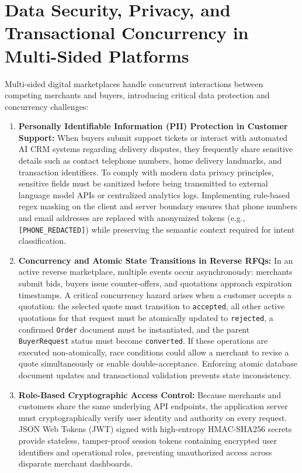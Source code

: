 \section{Data Security, Privacy, and Transactional Concurrency in Multi-Sided Platforms}

Multi-sided digital marketplaces handle concurrent interactions between competing merchants and buyers, introducing critical data protection and concurrency challenges:

\begin{enumerate}
    \item \textbf{Personally Identifiable Information (PII) Protection in Customer Support:} When buyers submit support tickets or interact with automated AI CRM systems regarding delivery disputes, they frequently share sensitive details such as contact telephone numbers, home delivery landmarks, and transaction identifiers. To comply with modern data privacy principles, sensitive fields must be sanitized before being transmitted to external language model APIs or centralized analytics logs. Implementing rule-based regex masking on the client and server boundary ensures that phone numbers and email addresses are replaced with anonymized tokens (e.g., \texttt{[PHONE\_REDACTED]}) while preserving the semantic context required for intent classification.
    \item \textbf{Concurrency and Atomic State Transitions in Reverse RFQs:} In an active reverse marketplace, multiple events occur asynchronously: merchants submit bids, buyers issue counter-offers, and quotations approach expiration timestamps. A critical concurrency hazard arises when a customer accepts a quotation: the selected quote must transition to \texttt{accepted}, all other active quotations for that request must be atomically updated to \texttt{rejected}, a confirmed \texttt{Order} document must be instantiated, and the parent \texttt{BuyerRequest} status must become \texttt{converted}. If these operations are executed non-atomically, race conditions could allow a merchant to revise a quote simultaneously or enable double-acceptance. Enforcing atomic database document updates and transactional validation prevents state inconsistency.
    \item \textbf{Role-Based Cryptographic Access Control:} Because merchants and customers share the same underlying API endpoints, the application server must cryptographically verify user identity and authority on every request. JSON Web Tokens (JWT) signed with high-entropy HMAC-SHA256 secrets provide stateless, tamper-proof session tokens containing encrypted user identifiers and operational roles, preventing unauthorized access across disparate merchant dashboards.
\end{enumerate}

